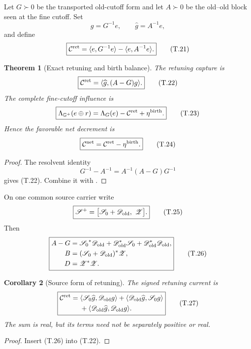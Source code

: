 \documentclass[11pt]{article}
\newtheorem{theorem}{Theorem}[section]
\newtheorem{corollary}[theorem]{Corollary}
\theoremstyle{definition}
\theoremstyle{remark}
\begin{document}
Let \(G\succ0\) be the transported old-cutoff form and let \(A\succ0\) be the
old--old block seen at the fine cutoff.  Set
\[
 g=G^{-1}e,
 \qquad
 \widehat g=A^{-1}e,
 \tag{T.20}
\]
and define
\[
 \boxed{
 \mathcal C^{\rm ret}
 =\langle e,G^{-1}e\rangle-\langle e,A^{-1}e\rangle.}
 \tag{T.21}
\]

\begin{theorem}[Exact retuning and birth balance]
\label{thm:birth-retuning-balance}
The retuning capture is
\[
 \boxed{
 \mathcal C^{\rm ret}
 =\langle\widehat g,(A-G)g\rangle.}
 \tag{T.22}
\]
The complete fine-cutoff influence is
\[
 \boxed{
 \Lambda_{\mathbb G^+}(e\oplus r)
 =\Lambda_G(e)-\mathcal C^{\rm ret}+\eta^{\rm birth}.}
 \tag{T.23}
\]
Hence the favorable net decrement is
\[
 \boxed{
 \mathcal C^{\rm net}
 =\mathcal C^{\rm ret}-\eta^{\rm birth}.}
 \tag{T.24}
\]
\end{theorem}

\begin{proof}
The resolvent identity
\[
 G^{-1}-A^{-1}=A^{-1}(A-G)G^{-1}
\]
gives \textup{(T.22)}.  Combine it with
.
\end{proof}

On one common source carrier write
\[
 \boxed{
 \mathscr S^+
 =\bigl[\mathscr S_0+\mathscr D_{\rm old},\ \mathscr Z\bigr].}
 \tag{T.25}
\]
Then
\[
 \boxed{
 \begin{aligned}
 A-G
 &={\mathscr S_0}^*\mathscr D_{\rm old}
   +\mathscr D_{\rm old}^*\mathscr S_0
   +\mathscr D_{\rm old}^*\mathscr D_{\rm old},\\
 B&=(\mathscr S_0+\mathscr D_{\rm old})^*\mathscr Z,\\
 D&=\mathscr Z^*\mathscr Z.
 \end{aligned}}
 \tag{T.26}
\]

\begin{corollary}[Source form of retuning]
\label{cor:birth-source-retuning}
The signed retuning current is
\[
 \boxed{
 \begin{aligned}
 \mathcal C^{\rm ret}
 ={}&\langle\mathscr S_0\widehat g,\mathscr D_{\rm old}g\rangle
   +\langle\mathscr D_{\rm old}\widehat g,\mathscr S_0g\rangle\\
  &+\langle\mathscr D_{\rm old}\widehat g,
              \mathscr D_{\rm old}g\rangle.
 \end{aligned}}
 \tag{T.27}
\]
The sum is real, but its terms need not be separately positive or real.
\end{corollary}

\begin{proof}
Insert \textup{(T.26)} into \textup{(T.22)}.
\end{proof}
\end{document}
